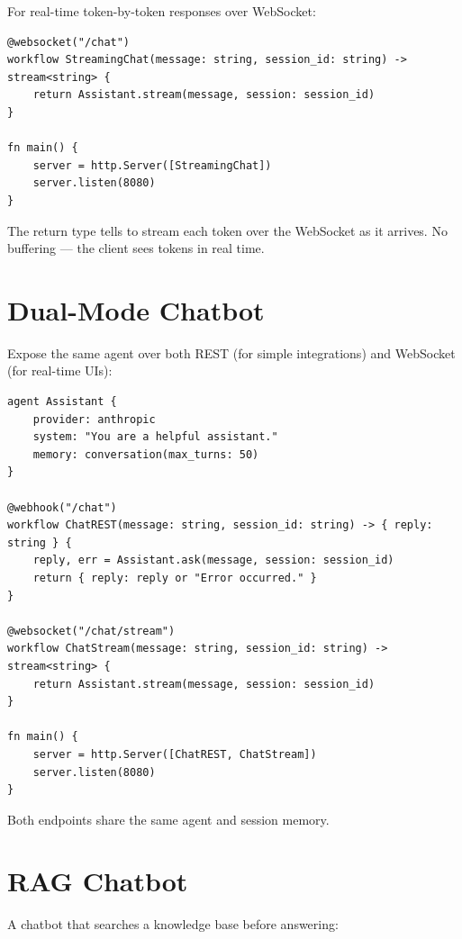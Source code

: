 For real-time token-by-token responses over WebSocket:

\begin{lstlisting}
@websocket("/chat")
workflow StreamingChat(message: string, session_id: string) -> stream<string> {
    return Assistant.stream(message, session: session_id)
}

fn main() {
    server = http.Server([StreamingChat])
    server.listen(8080)
}
\end{lstlisting}

The  return type tells \haira{} to stream each token over the WebSocket as it arrives. No buffering --- the client sees tokens in real time.

\section{Dual-Mode Chatbot}

Expose the same agent over both REST (for simple integrations) and WebSocket (for real-time UIs):

\begin{lstlisting}
agent Assistant {
    provider: anthropic
    system: "You are a helpful assistant."
    memory: conversation(max_turns: 50)
}

@webhook("/chat")
workflow ChatREST(message: string, session_id: string) -> { reply: string } {
    reply, err = Assistant.ask(message, session: session_id)
    return { reply: reply or "Error occurred." }
}

@websocket("/chat/stream")
workflow ChatStream(message: string, session_id: string) -> stream<string> {
    return Assistant.stream(message, session: session_id)
}

fn main() {
    server = http.Server([ChatREST, ChatStream])
    server.listen(8080)
}
\end{lstlisting}

Both endpoints share the same agent and session memory.

\section{RAG Chatbot}

A chatbot that searches a knowledge base before answering:

